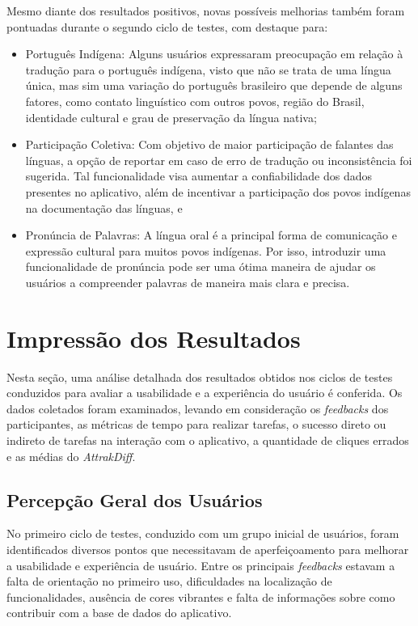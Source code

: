 Mesmo diante dos resultados positivos, novas possíveis melhorias também foram pontuadas durante o segundo ciclo de testes, com destaque para:

\begin{itemize}
	\item Português Indígena: Alguns usuários expressaram preocupação em relação à tradução para o português indígena, visto que não se trata de uma língua única, mas sim uma variação do português brasileiro que depende de alguns fatores, como contato linguístico com outros 
	povos, região do Brasil, identidade cultural e grau de preservação da língua nativa;
	\item Participação Coletiva: Com objetivo de maior participação de falantes das línguas, a opção de reportar em caso de erro de tradução ou inconsistência foi sugerida. Tal funcionalidade visa aumentar a confiabilidade dos dados presentes no aplicativo, além de incentivar a 
	participação dos povos indígenas na documentação das línguas, e
	\item Pronúncia de Palavras: A língua oral é a principal forma de comunicação e expressão cultural para muitos povos indígenas. Por isso, introduzir uma funcionalidade de pronúncia pode ser uma ótima maneira de ajudar os usuários a compreender palavras de maneira mais clara 
	e precisa.
\end{itemize}

\section{Impressão dos Resultados}
\label{sec:Impressão dos Resultados}
Nesta seção, uma análise detalhada dos resultados obtidos nos ciclos de testes conduzidos para avaliar a usabilidade e a experiência do usuário é conferida. Os dados coletados foram examinados, levando em consideração os \textit{feedbacks} dos participantes, as métricas de 
tempo para realizar tarefas, o sucesso direto ou indireto de tarefas na interação com o aplicativo, a quantidade de cliques errados e as médias do \textit{AttrakDiff}.

\subsection{Percepção Geral dos Usuários}
\label{sec:Percepção Geral dos Usuários}
No primeiro ciclo de testes, conduzido com um grupo inicial de usuários, foram identificados diversos pontos que necessitavam de aperfeiçoamento para melhorar a usabilidade e experiência de usuário. Entre os principais \textit{feedbacks} estavam a falta de orientação no primeiro uso, 
dificuldades na localização de funcionalidades, ausência de cores vibrantes e falta de informações sobre como contribuir com a base de dados do aplicativo.

